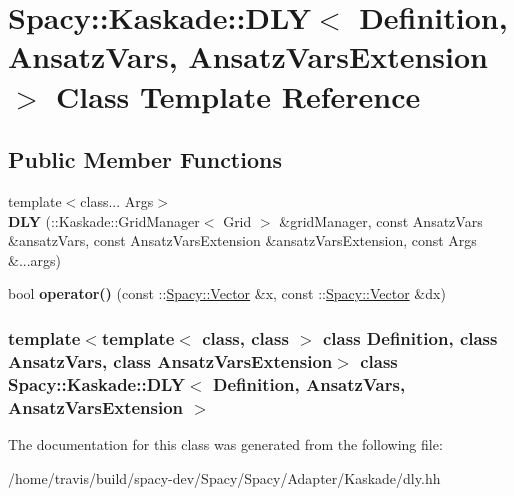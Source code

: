\hypertarget{classSpacy_1_1Kaskade_1_1DLY}{\section{\-Spacy\-:\-:\-Kaskade\-:\-:\-D\-L\-Y$<$ \-Definition, \-Ansatz\-Vars, \-Ansatz\-Vars\-Extension $>$ \-Class \-Template \-Reference}
\label{classSpacy_1_1Kaskade_1_1DLY}
}
\subsection*{\-Public \-Member \-Functions}
\begin{DoxyCompactItemize}
\item 
\hypertarget{classSpacy_1_1Kaskade_1_1DLY_ad6ad6ff4ac8b00b0f6c3a607e99f0a81}{{\footnotesize template$<$class... \-Args$>$ }\\{\bfseries \-D\-L\-Y} (\-::\-Kaskade\-::\-Grid\-Manager$<$ \-Grid $>$ \&grid\-Manager, const \-Ansatz\-Vars \&ansatz\-Vars, const \-Ansatz\-Vars\-Extension \&ansatz\-Vars\-Extension, const \-Args \&...args)}\label{classSpacy_1_1Kaskade_1_1DLY_ad6ad6ff4ac8b00b0f6c3a607e99f0a81}

\item 
\hypertarget{classSpacy_1_1Kaskade_1_1DLY_ad65881ff822a7407900909dcb8fad771}{bool {\bfseries operator()} (const \-::\hyperlink{classSpacy_1_1Vector}{\-Spacy\-::\-Vector} \&x, const \-::\hyperlink{classSpacy_1_1Vector}{\-Spacy\-::\-Vector} \&dx)}\label{classSpacy_1_1Kaskade_1_1DLY_ad65881ff822a7407900909dcb8fad771}

\end{DoxyCompactItemize}
\subsubsection*{template$<$template$<$ class, class $>$ class \-Definition, class Ansatz\-Vars, class Ansatz\-Vars\-Extension$>$ class Spacy\-::\-Kaskade\-::\-D\-L\-Y$<$ Definition, Ansatz\-Vars, Ansatz\-Vars\-Extension $>$}



\-The documentation for this class was generated from the following file\-:\begin{DoxyCompactItemize}
\item 
/home/travis/build/spacy-\/dev/\-Spacy/\-Spacy/\-Adapter/\-Kaskade/dly.\-hh\end{DoxyCompactItemize}
